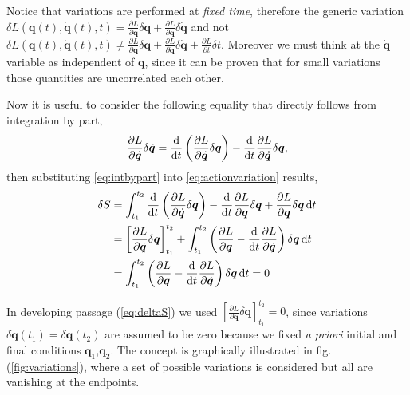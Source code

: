 		\begin{remark}
			Notice that variations are performed at \emph{fixed time}, 
			therefore the generic variation 
			$\delta L(\bm{q}(t),\bm{\dot{q}}(t),t) 
			 = \frac{\partial L}{\partial\bm{q}}\delta \bm{q}+\frac{\partial L}{\partial\bm{\dot{q}}}
			 \delta\bm{\dot{q}}$
			and not $\delta L(\bm{q}(t),\bm{\dot{q}}(t),t)\neq\frac{\partial L}{\partial\bm{q}}
			\delta \bm{q}+\frac{\partial L}{\partial\bm{\dot{q}}}
			\delta\bm{\dot{q}}+\frac{\partial L}{\partial t}\delta t$.
			Moreover we must think at the $\dot{\bm{q}}$ variable as independent
			of $\bm{q}$, since it can be proven that for small variations those
			quantities are uncorrelated each other.
		\end{remark}
		Now it is useful to consider the following equality that directly follows from integration by part,
		\begin{equation}
			\label{eq:intbypart}
			\frac{\partial L}{\partial\dot{\bm{q}}}\delta\dot{\bm{q}}
			= \frac{\mathop{}\!\mathrm{d}}{\mathop{}\!\mathrm{d} t}\left(\frac{\partial L}{\partial\dot{\bm{q}}}
			\delta \bm{q}\right)-\frac{\mathop{}\!\mathrm{d}}{\mathop{}\!\mathrm{d} t}\frac{\partial L}{\partial \bm{\dot{q}}}\delta \bm{q},
		\end{equation}
		then substituting \cref{eq:intbypart} into \cref{eq:actionvariation} results,
		\begin{subequations}
			\begin{align}
				\delta S 
				&= \int_{t_{1}}^{t_{2}}\frac{\diff}{\diff t}
				\left(\frac{\partial L}{\partial\dot{\bm{q}}}\delta \bm{q}\right)-\frac{\diff}{\diff t}
				\frac{\partial L}{\partial \bm{q}}\delta \bm{q} + 
				\frac{\partial L}{\partial \bm{q}}\delta \bm{q}\diff t \\
				\label{eq:deltaS}
				&= \left[\frac{\partial L}{\partial\dot{\bm{q}}}\delta \bm{q}\right]_{t_{1}}^{t_{2}}+
				\int_{t_{1}}^{t_{2}}\left(\frac{\partial L}{\partial \bm{q}}
				-\frac{\diff}{\diff t}\frac{\partial L}{\partial\dot{\bm{q}}}\right)\delta \bm{q}\diff t \\
				&= \int_{t_{1}}^{t_{2}}\left(\frac{\partial L}{\partial \bm{q}}
				-\frac{\diff}{\diff t}\frac{\partial L}{\partial\dot{\bm{q}}}\right)\delta \bm{q}\diff t = 0
			\end{align}
		\end{subequations}
		\begin{remark}
			In developing passage (\ref{eq:deltaS}) we used 
			$\left[\frac{\partial L}{\partial\dot{\bm{q}}}\delta \bm{q}\right]_{t_{1}}^{t_{2}} = 0$,
			since variations
			$\delta\bm{q}(t_{1}) = \delta\bm{q}(t_{2})$ are assumed to be zero because we fixed 
			\emph{a priori} initial and final conditions $\bm{q}_{1}$,$\bm{q}_{2}$.
			The concept is graphically illustrated in fig. (\ref{fig:variations}), 
			where a set of possible variations is considered but all are vanishing at the endpoints.
		\end{remark}

